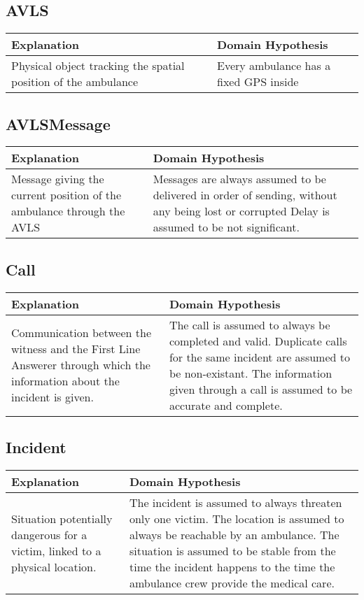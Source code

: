 \subsection{\og AVLS \fg}

\begin{tabularx}{\textwidth}{|X|X|} \hline
Explanation & Domain Hypothesis\\ \hline
Physical object tracking the spatial position of the ambulance
&  Every ambulance has a fixed GPS inside \\ \hline
\end{tabularx}


\subsection{AVLSMessage}

\begin{tabularx}{\textwidth}{|X|X|} \hline
Explanation & Domain Hypothesis\\ \hline
Message giving the current position of the ambulance through the AVLS
& Messages are always assumed to be delivered in order of sending, without any being lost or corrupted Delay is assumed to be not significant. \\ \hline
\end{tabularx}


\subsection{Call}

\begin{tabularx}{\textwidth}{|X|X|} \hline
Explanation & Domain Hypothesis\\ \hline
Communication between the witness and the First Line Answerer through which the information about the incident is given.
& The call is assumed to always be completed and valid.  Duplicate calls for the same incident are assumed to be non-existant.  The information given through a call is assumed to be accurate and complete. \\ \hline
\end{tabularx}


\subsection{Incident}

\begin{tabularx}{\textwidth}{|X|X|} \hline
Explanation & Domain Hypothesis\\ \hline
Situation potentially dangerous for a victim, linked to a physical location.
& The incident is assumed to always threaten only one victim.  The location is assumed to always be reachable by an ambulance.  The situation is assumed to be stable from the time the incident happens to the time the ambulance crew provide the medical care. \\ \hline
\end{tabularx}



